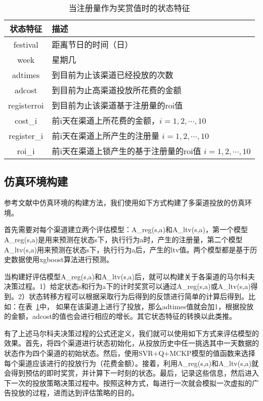 \begin{table}[htbp]
  \centering
  \caption{当注册量作为奖赏值时的状态特征}
  \label{tab:obser_ad_register}
  \begin{tabular}{cl}
    \toprule
      状态特征 & 描述 \\
    \midrule
      festival & 距离节日的时间（日） \\
      week & 星期几 \\
      adtimes & 到目前为止该渠道已经投放的次数 \\
      adcost & 到目前为止高渠道投放所花费的金额 \\
      registerroi & 到目前为止该渠道基于注册量的roi值 \\
      cost_i & 前i天在渠道上所花费的金额，$i=1,2,\cdots,10$ \\
      register_i & 前i天在渠道上所产生的注册量 $i=1,2,\cdots,10$\\
      roi_i & 前i天在渠道上锁产生的基于注册量的roi值 $i=1,2,\cdots,10$\\
    \bottomrule
  \end{tabular}
\end{table}

\subsection{仿真环境构建}
参考文献\citep{pednault2002sequential}中仿真环境的构建方法，我们使用如下方式构建了多渠道投放的仿真环境。

首先需要对每个渠道建立两个评估模型：A_{reg}(s,a)和A_{ltv}(s,a)，第一个模型A_{reg}(s,a)是用来预测在状态s下，执行行为a时，产生的注册量，第二个模型A_{ltv}(s,a)用来预测在状态s下，执行行为a后，产生的ltv值。两个模型都是基于历史数据使用xgboost算法进行预测。

当构建好评估模型A_{reg}(s,a)和A_{ltv}(s,a)后，就可以构建关于各渠道的马尔科夫决策过程。1）给定状态s和行为a下的计时奖赏可以通过A_{reg}(s,a)或A_{ltv}(s,a)得到。2）状态转移方程可以根据采取行为后得到的反馈进行简单的计算后得到。比如：在表~\ref{tab:obser_ad_register}中，
如果在该渠道上进行了投放，那么adtimes值就会加1，根据投放的金额，adcost的值也会进行相应的增长。其它状态特征的转换以此类推。

有了上述马尔科夫决策过程的公式还定义，我们就可以使用如下方式来评估模型的效果。首先，将四个渠道进行状态初始化，从投放历史中任一挑选其中一天数据的状态作为四个渠道的初始状态。然后，使用SVR+Q+MCKP模型的值函数来选择每个渠道应该进行的投放行为（花费金额）。接着，利用A_{reg}(s,a)和A_{ltv}(s,a)就会得到预估的即时奖赏，并计算下一时刻的状态。最后，记录这些信息，然后进入下一次的投放策略决策过程中。按照这种方式，每进行一次就会模拟一次虚拟的广告投放的过程，进而达到评估策略的目的。

